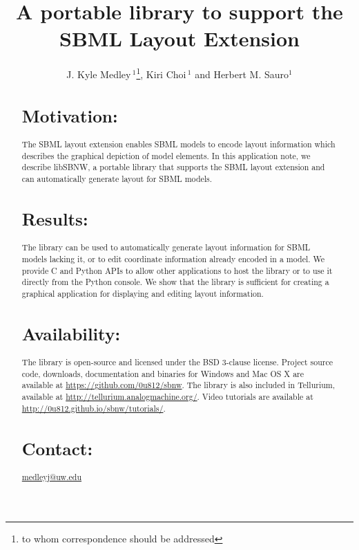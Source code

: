 \documentclass{bioinfo}
\begin{document}

\title[SBML Layout Library]{A portable library to support the SBML Layout Extension}
\author[Medley \textit{et~al}]{J. Kyle Medley\,$^{1}$\footnote{to whom correspondence should be addressed}, Kiri Choi\,$^{1}$ and Herbert M. Sauro$^{1}$ }
\address{$^{1}$Department of Bioengineering, University of Washington, Seattle, WA 98195, USA.}



\maketitle

\begin{abstract}

\section{Motivation:}
The SBML layout extension enables SBML models to encode layout information
which describes the graphical depiction of model elements. In this application note, we describe libSBNW, a portable library that supports the SBML layout extension and can automatically generate layout for SBML models.

\section{Results:}
The library can be used to automatically
generate layout information for SBML models lacking it, or to edit coordinate information already encoded in a model. 
We provide C and Python APIs to allow other applications to host the library or to use it directly from the Python console.
We show that the library is sufficient for creating a graphical application for displaying and editing layout information.

\section{Availability:}
The library is open-source and licensed under the BSD 3-clause license. Project source code, downloads, documentation and binaries for Windows and Mac OS X are available at \href{https://github.com/0u812/sbnw}{https://github.com/0u812/sbnw}. The library is also included in Tellurium, available at \href{http://tellurium.analogmachine.org/}{http://tellurium.analogmachine.org/}.
Video tutorials are available at \href{http://0u812.github.io/sbnw/tutorials/}{http://0u812.github.io/sbnw/tutorials/}.

\section{Contact:} \href{medleyj@uw.edu}{medleyj@uw.edu}
\end{abstract}
\end{document}
